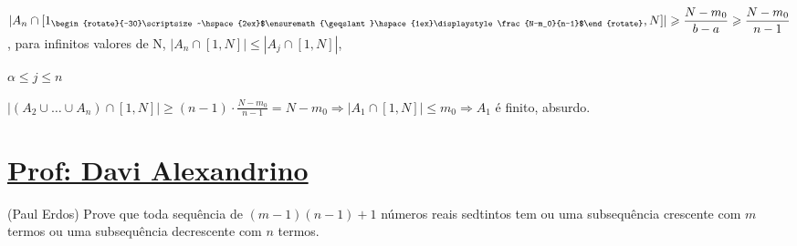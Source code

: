 \documentclass[a4paper,12pt]{article}
\renewcommand{\leq}{\ensuremath{\leqslant}}
\renewcommand{\geq}{\ensuremath{\geqslant}}
\theoremstyle{plain} %
\theoremstyle{definition} %
\theoremstyle{remark} %
\newcommand*\circled[1]{\tikz[baseline=(char.base)]{
		\node[shape=circle,draw,inner sep=2pt] (char) {#1};}}%
\newcommand{\rotsup}[1]{\begin{rotate}{-30}\scriptsize ~#1\end{rotate}}%
\begin{document}
\begin{framed}
		$|A_n\cap [1_{\rotsup{\hspace{2ex}$\geq\hspace{1ex}\displaystyle\frac{N-m_0}{n-1}$}},N]|\geq \displaystyle\frac{N-m_0}{b-a}\geq \displaystyle\frac{N-m_0}{n-1}$, para infinitos valores de N, $|A_n\cap [1,N]|\leq |A_j\cap [1,N]|$, 
		
		\vspace{7ex} $\alpha\leq j\leq n$ %
		
		$|(A_2\cup\dotso\cup A_n)\cap [1,N]|\geq (n-1)\cdot\displaystyle\frac{N-m_0}{n-1}=N-m_0\Rightarrow |A_1\cap [1,N]|\leq m_0\Rightarrow A_1$ \'e finito, absurdo.
	\end{framed}
	
	\newpage
	\section*{\underline{Prof: Davi Alexandrino}}
	
	\circled{1} (Paul Erdos) Prove que toda sequ\^encia de $(m-1)(n-1)+1$ n\'umeros reais sedtintos tem ou uma subsequ\^encia crescente com $m$ termos ou uma subsequ\^encia decrescente com $n$ termos.
	
\end{document}
